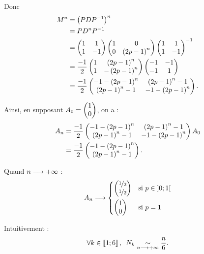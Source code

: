 \begin{corr}[Exercice 1, 2]
Donc \[\begin{aligned}
M^n&=\left(PDP^{-1}\right)^n \\
&=PD^nP^{-1} \\
&=\begin{pmatrix}
1 & 1 \\
1 & -1
\end{pmatrix}\begin{pmatrix}
1 & 0 \\
0 & \left(2p-1\right)^n
\end{pmatrix}\begin{pmatrix}
1 & 1 \\
1 & -1
\end{pmatrix}^{-1} \\
&=\dfrac{-1}{2}\begin{pmatrix}
1 & \left(2p-1\right)^n \\
1 & -\left(2p-1\right)^n
\end{pmatrix}\begin{pmatrix}
-1 & -1 \\
-1 & 1
\end{pmatrix} \\
&=\dfrac{-1}{2}\begin{pmatrix}
-1-\left(2p-1\right)^n & \left(2p-1\right)^n-1 \\
\left(2p-1\right)^n-1 & -1-\left(2p-1\right)^n
\end{pmatrix}.
\end{aligned}\]

Ainsi, en supposant \(A_0=\begin{pmatrix}1\\0\end{pmatrix}\), on a : \[\begin{aligned}
A_n&=\dfrac{-1}{2}\begin{pmatrix}
-1-\left(2p-1\right)^n & \left(2p-1\right)^n-1 \\
\left(2p-1\right)^n-1 & -1-\left(2p-1\right)^n
\end{pmatrix}A_0 \\
&=\dfrac{-1}{2}\begin{pmatrix}-1-\left(2p-1\right)^n\\\left(2p-1\right)^n-1\end{pmatrix}.
\end{aligned}\]

Quand \(n\longrightarrow+\infty\) : \[A_n\longrightarrow\begin{dcases}
\begin{pmatrix}\nicefrac{1}{2}\\\nicefrac{1}{2}\end{pmatrix} &\text{si }p\in\left]0;1\right[ \\
\begin{pmatrix}1\\0\end{pmatrix} &\text{si }p=1
\end{dcases}\]
\end{corr}

\begin{corr}[Exercice 2, 1]
Intuitivement : \[\quantifs{\forall k\in\interventierii{1}{6}}N_k\simqd{n\to\pinf}\dfrac{n}{6}.\]
\end{corr}

